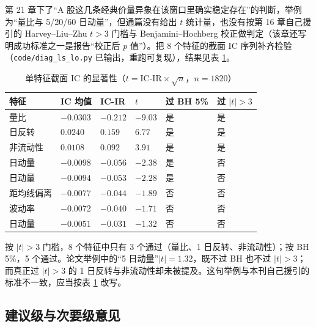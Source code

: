 \documentclass[11pt,a4paper]{ctexart}
\begin{document}
第 21 章下了“A 股这几条经典价量异象在该窗口里确实稳定存在”的判断，举例为“量比与 5/20/60 日动量”，但通篇没有给出 $t$ 统计量，也没有按第 16 章自己援引的 Harvey--Liu--Zhu $t>3$ 门槛与 Benjamini--Hochberg 校正做判定（该章还写明成功标准之一是报告“校正后 $p$ 值”）。把 8 个特征的截面 IC 序列补齐检验（\texttt{code/diag\_ls\_lo.py} 已输出，重跑可复现），结果见表 \ref{tab:tstat}。

\begin{table}[htbp]
\centering
\caption{单特征截面 IC 的显著性（$t=\text{IC-IR}\times\sqrt{n}$，$n=1820$）}
\label{tab:tstat}
\begin{tabular}{@{}>{\raggedright\arraybackslash}p{3.0cm}>{\raggedright\arraybackslash}p{2.2cm}>{\raggedright\arraybackslash}p{2.0cm}>{\raggedright\arraybackslash}p{1.8cm}>{\raggedright\arraybackslash}p{2.0cm}>{\raggedright\arraybackslash}p{2.4cm}@{}}
\toprule
特征 & IC 均值 & IC-IR & $t$ & 过 BH 5\% & 过 $|t|>3$ \\
\midrule
量比 & $-0.0303$ & $-0.212$ & $-9.03$ & 是 & 是 \\
1 日反转 & $0.0240$ & $0.159$ & $6.77$ & 是 & 是 \\
非流动性 & $0.0108$ & $0.092$ & $3.91$ & 是 & 是 \\
20 日动量 & $-0.0098$ & $-0.056$ & $-2.38$ & 是 & 否 \\
60 日动量 & $-0.0094$ & $-0.053$ & $-2.28$ & 是 & 否 \\
距均线偏离 & $-0.0077$ & $-0.044$ & $-1.89$ & 否 & 否 \\
波动率 & $-0.0072$ & $-0.040$ & $-1.71$ & 否 & 否 \\
5 日动量 & $-0.0051$ & $-0.031$ & $-1.32$ & 否 & 否 \\
\bottomrule
\end{tabular}
\end{table}

按 $|t|>3$ 门槛，8 个特征中只有 3 个通过（量比、1 日反转、非流动性）；按 BH 5\%，5 个通过。论文举例中的“5 日动量”$|t|=1.32$，既不过 BH 也不过 $|t|>3$；而真正过 $|t|>3$ 的 1 日反转与非流动性却未被提及。这句举例与本刊自己援引的标准不一致，应当按表 \ref{tab:tstat} 改写。

\subsection{建议级与次要级意见}
\end{document}
